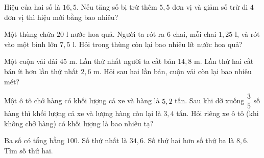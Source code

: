 \begin{ex} %
Hiệu của hai số là $16{,}5$. Nếu tăng số bị trừ thêm $5{,}5$ đơn vị và giảm số trừ đi $4$ đơn vị thì hiệu mới bằng bao nhiêu?
\end{ex}

\begin{ex} %
Một thùng chứa $20\text{ l}$ nước hoa quả. Người ta rót ra 6 chai, mỗi chai $1{,}25\text{ l}$, và rót vào một bình lớn $7{,}5\text{ l}$. Hỏi trong thùng còn lại bao nhiêu lít nước hoa quả?
\end{ex}

\begin{ex} %
Một cuộn vải dài $45\text{ m}$. Lần thứ nhất người ta cắt bán $14{,}8\text{ m}$. Lần thứ hai cắt bán ít hơn lần thứ nhất $2{,}6\text{ m}$. Hỏi sau hai lần bán, cuộn vải còn lại bao nhiêu mét?
\end{ex}

\begin{ex} %
Một ô tô chở hàng có khối lượng cả xe và hàng là $5{,}2$ tấn. Sau khi dỡ xuống $\dfrac{3}{5}$ số hàng thì khối lượng cả xe và lượng hàng còn lại là $3{,}4$ tấn. Hỏi riêng xe ô tô (khi không chở hàng) có khối lượng là bao nhiêu tạ?
\end{ex}

\begin{ex} %
Ba số có tổng bằng $100$. Số thứ nhất là $34{,}6$. Số thứ hai hơn số thứ ba là $8{,}6$. Tìm số thứ hai.
\end{ex}
